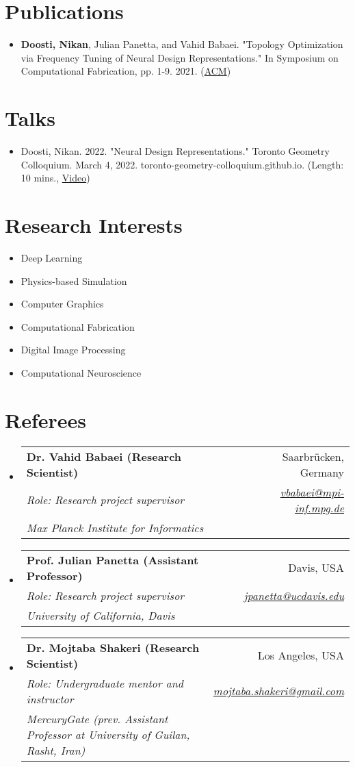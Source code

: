 \documentclass[letterpaper,11pt]{article}
\makeatletter
\newcommand{\resumeItem}[1]{
  \item\small{
    {#1 \vspace{-2pt}}
  }
}
\newcommand{\resumeSubheading}[5]{
  \item
    \begin{tabular*}{0.97\textwidth}{l@{\extracolsep{\fill}}r}
      \textbf{#1} & #2 \\ 
      \textit{\small#3} & \textit{\small #4} \\
      \textit{#5} & 
    \end{tabular*}\vspace{-5pt}
}
\newcommand{\resumeSubHeadingListStart}{\begin{itemize}[leftmargin=*]}
\newcommand{\resumeSubHeadingListEnd}{\end{itemize}}
\makeatother
\begin{document}
\section{Publications}
 \resumeSubHeadingListStart
   \resumeItem{\textbf{Doosti, Nikan}, Julian Panetta, and Vahid Babaei. "Topology Optimization via Frequency Tuning of Neural Design Representations." In Symposium on Computational Fabrication, pp. 1-9. 2021. (\href{https://dl.acm.org/doi/abs/10.1145/3485114.3485124}{ACM})}
\resumeSubHeadingListEnd

\section{Talks}
 \resumeSubHeadingListStart
   \resumeItem{Doosti, Nikan. 2022. "Neural Design Representations." Toronto Geometry Colloquium. March 4, 2022. toronto-geometry-colloquium.github.io. (Length: 10 mins., \href{https://youtu.be/FdPwG2kNv0M}{Video})} 
\resumeSubHeadingListEnd

\section{Research Interests}
  \resumeSubHeadingListStart
    \resumeItem{Deep Learning}
    \vspace{-5pt}
    \resumeItem{Physics-based Simulation}
    \vspace{-5pt}
    \resumeItem{Computer Graphics} 
    \vspace{-5pt}
    \resumeItem{Computational Fabrication}
    \vspace{-5pt}
    \resumeItem{Digital Image Processing}
    \vspace{-5pt}
    \resumeItem{Computational Neuroscience}
  \resumeSubHeadingListEnd

\section{Referees}
  \resumeSubHeadingListStart
    \resumeSubheading
      {Dr. Vahid Babaei (Research Scientist)}{Saarbr{\"u}cken, Germany}
       {Role: Research project supervisor}
      {\href{mailto:vbabaei@mpi-inf.mpg.de}{vbabaei@mpi-inf.mpg.de}}{Max Planck Institute for Informatics}

    \resumeSubheading
      {Prof. Julian Panetta (Assistant Professor)}{Davis, USA}
       {Role: Research project supervisor}
      {\href{mailto:jpanetta@ucdavis.edu}{jpanetta@ucdavis.edu}}{University of California, Davis}
    
    \resumeSubheading
      {Dr. Mojtaba Shakeri (Research Scientist)}{Los Angeles, USA}
       {Role: Undergraduate mentor and instructor}
      {\href{mailto:mojtaba.shakeri@gmail.com}{mojtaba.shakeri@gmail.com}}{MercuryGate (prev. Assistant Professor at University of Guilan, Rasht, Iran)}
  \resumeSubHeadingListEnd
\end{document}
